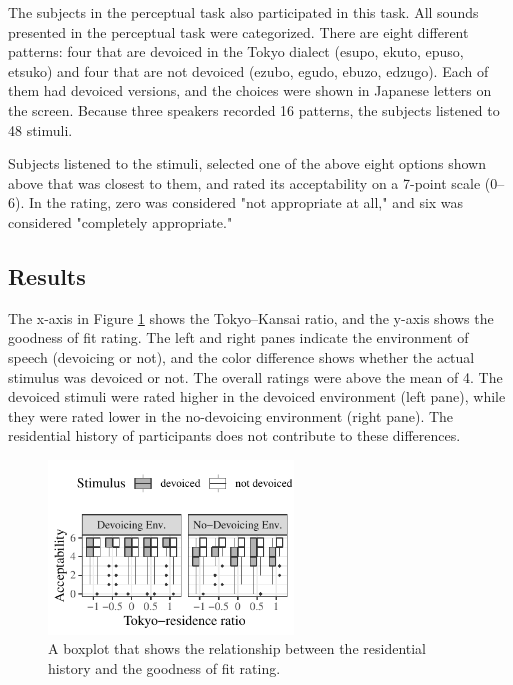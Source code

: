 \documentclass[a4paper,11pt,twocolumn]{article}
\begin{document}
The subjects in the perceptual task also participated in this task. All sounds presented in the perceptual task were categorized. There are eight different patterns: four that are devoiced in the Tokyo dialect (esupo, ekuto, epuso, etsuko) and four that are not devoiced (ezubo, egudo, ebuzo, edzugo). Each of them had devoiced versions, and the choices were shown in Japanese letters on the screen. Because three speakers recorded 16 patterns, the subjects listened to 48 stimuli.

Subjects listened to the stimuli, selected one of the above eight options shown above that was closest to them, and rated its acceptability on a 7-point scale (0--6). In the rating, zero was considered "not appropriate at all," and six was considered "completely appropriate."

\subsection{Results}

The x-axis in Figure \ref{fig:cat_results} shows the Tokyo--Kansai ratio, and the y-axis shows the goodness of fit rating. The left and right panes indicate the environment of speech (devoicing or not), and the color difference shows whether the actual stimulus was devoiced or not. The overall ratings were above the mean of 4. The devoiced stimuli were rated higher in the devoiced environment (left pane), while they were rated lower in the no-devoicing environment (right pane). The residential history of participants does not contribute to these differences.
\begin{figure}[!ht]
\begin{center}
\includegraphics[width=6.5cm]{../results/artifact/results_categorization.pdf}
\caption{A boxplot that shows the relationship between the residential history and the goodness of fit rating.}\label{fig:cat_results}
\end{center}
\end{figure}
\end{document}
